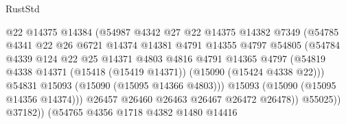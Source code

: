 \begin{lexlean}{RustStd}
\begin{coremodule}
                                    @22
                                    @14375
                                    @14384
                                    (@54987
                                      @4342
                                      @27
                                      @22
                                      @14375
                                      @14382
                                      @7349
                                      (@54785
                                        @4341
                                        @22
                                        @26
                                        @6721
                                        @14374
                                        @14381
                                        @4791
                                        @14355
                                        @4797
                                        @54805
                                        (@54784
                                          @4339
                                          @124
                                          @22
                                          @25
                                          @14371
                                          @4803
                                          @4816
                                          @4791
                                          @14365
                                          @4797
                                          (@54819
                                            @4338
                                            @14371
                                            (@15418 (@15419 @14371))
                                            (@15090 (@15424 @4338 @22)))
                                          @54831
                                          @15093
                                          (@15090 (@15095 @14366 @4803)))
                                        @15093
                                        (@15090 (@15095 @14356 @14374)))
                                      @26457
                                      @26460
                                      @26463
                                      @26467
                                      @26472
                                      @26478))
                                  @55025))
                              @37182))
                          (@54765
                            @4356
                            @1718
                            @4382
                            @1480
                            @14416

\end{coremodule}
\end{lexlean}
